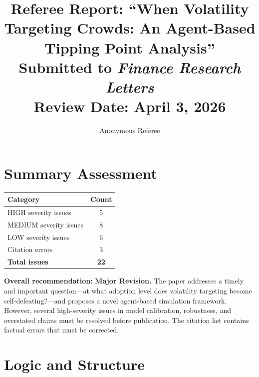 \documentclass[12pt,a4paper]{article}
\title{Referee Report: ``When Volatility Targeting Crowds: An Agent-Based Tipping Point Analysis''\\[0.5em]
\large Submitted to \emph{Finance Research Letters}\\[0.3em]
\normalsize Review Date: April 3, 2026}
\author{Anonymous Referee}
\date{}
\begin{document}
\maketitle

\section*{Summary Assessment}

\begin{center}
\begin{tabular}{lc}
\toprule
\textbf{Category} & \textbf{Count} \\
\midrule
HIGH severity issues & 5 \\
MEDIUM severity issues & 8 \\
LOW severity issues & 6 \\
Citation errors & 3 \\
\midrule
\textbf{Total issues} & \textbf{22} \\
\bottomrule
\end{tabular}
\end{center}

\medskip

\noindent\textbf{Overall recommendation:} \textbf{Major Revision.} The paper addresses a timely and important question---at what adoption level does volatility targeting become self-defeating?---and proposes a novel agent-based simulation framework. However, several high-severity issues in model calibration, robustness, and overstated claims must be resolved before publication. The citation list contains factual errors that must be corrected.

\section{Logic and Structure}
\label{sec:logic}
\end{document}
